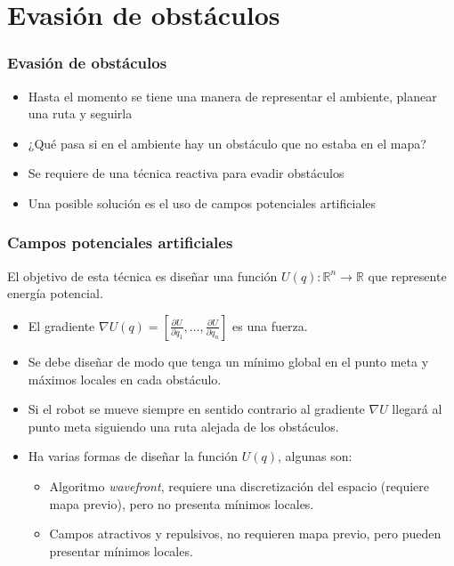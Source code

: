 \section{Evasión de obstáculos}
\begin{frame}\frametitle{Evasión de obstáculos}
  \begin{itemize}
  \item Hasta el momento se tiene una manera de representar el ambiente, planear una ruta y seguirla
  \item ¿Qué pasa si en el ambiente hay un obstáculo que no estaba en el mapa?
  \item Se requiere de una técnica reactiva para evadir obstáculos
  \item Una posible solución es el uso de campos potenciales artificiales
  \end{itemize}
\end{frame}

\begin{frame}\frametitle{Campos potenciales artificiales}
  El objetivo de esta técnica es diseñar una función $U(q):\mathbb{R}^n\rightarrow \mathbb{R}$ que represente energía potencial.
  \begin{itemize}
  \item El gradiente $\nabla U(q) = \left[\frac{\partial U}{\partial q_1},\dots,\frac{\partial U}{\partial q_n}\right]$ es una fuerza.
  \item Se debe diseñar de modo que tenga un mínimo global en el punto meta y máximos locales en cada obstáculo.
  \item Si el robot se mueve siempre en sentido contrario al gradiente $\nabla U$ llegará al punto meta siguiendo una ruta alejada de los obstáculos.
  \item Ha varias formas de diseñar la función $U(q)$, algunas son:
    \begin{itemize}
    \item Algoritmo \textit{wavefront}, requiere una discretización del espacio (requiere mapa previo), pero no presenta mínimos locales.
    \item Campos atractivos y repulsivos, no requieren mapa previo, pero pueden presentar mínimos locales. 
    \end{itemize}
  \end{itemize}
\end{frame}

